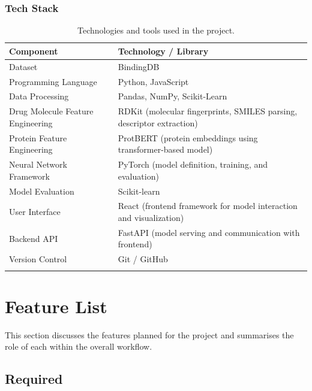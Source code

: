 \subsubsection{Tech Stack}
\begin{table}[H]
    \centering
    \begin{tabular}{@{}lp{10cm}@{}}
    \toprule
    \textbf{Component} & \textbf{Technology / Library} \\
    \midrule
    Dataset & BindingDB  \\
    \addlinespace
    \midrule
    Programming Language & Python, JavaScript\\
    \addlinespace
    \midrule
    Data Processing & Pandas, NumPy, Scikit-Learn \\
    \addlinespace
    \midrule
    Drug Molecule Feature Engineering & RDKit (molecular fingerprints, SMILES parsing, descriptor extraction) \\
    \addlinespace
    \midrule
    Protein Feature Engineering & ProtBERT (protein embeddings using transformer-based model) \\
    \addlinespace
    \midrule
    Neural Network Framework & PyTorch (model definition, training, and evaluation) \\
    \addlinespace
    \midrule
    Model Evaluation & Scikit-learn \\
    \addlinespace
    \midrule
    User Interface & React (frontend framework for model interaction and visualization) \\
    \addlinespace
    \midrule
    Backend API & FastAPI (model serving and communication with frontend) \\
    \addlinespace
    \midrule
    Version Control & Git / GitHub \\
    \addlinespace
    \bottomrule
    \end{tabular}
    \caption{Technologies and tools used in the project.}
    \label{tab:tech_stack}
\end{table}

\section{Feature List}
This section discusses the features planned for the project and summarises the role of each within the overall workflow.

\subsection{Required}
